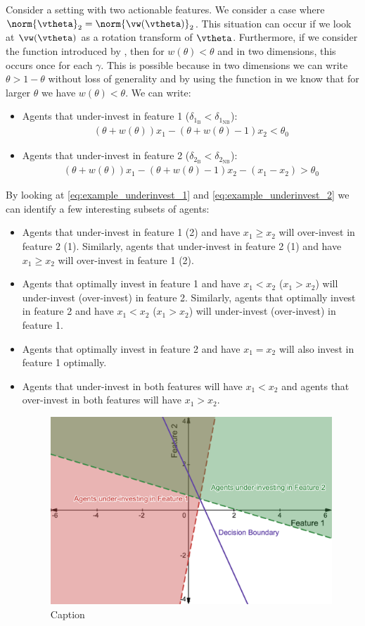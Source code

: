 Consider a setting with two actionable features. We consider a case where $\norm{\vtheta}_2 = \norm{\vw(\vtheta)}_2$. This situation can occur if we look at $\vw(\vtheta)$ as a rotation transform of $\vtheta$. Furthermore, if we consider the function introduced by \cite{Prelec1998}, then for $w(\theta)<\theta$ and in two dimensions, this occurs once for each $\gamma$. This is possible because in two dimensions we can write $\theta>1-\theta$ without loss of generality and by using the function in \cite{Prelec1998} we know that for larger $\theta$ we have $w(\theta)<\theta$. We can write:
\begin{itemize}
    \item Agents that under-invest in feature 1 ($\delta_{1_\text{B}}<\delta_{1_\text{NB}}$):
    \begin{align}\label{eq:example_underinvest_1}
         (\theta+w(\theta))x_1 - (\theta+w(\theta)-1)x_2 < \theta_0
    \end{align}
    \item Agents that under-invest in feature 2 ($\delta_{2_\text{B}}<\delta_{2_\text{NB}}$):
    \begin{align}\label{eq:example_underinvest_2}
         (\theta+w(\theta))x_1 - (\theta+w(\theta)-1)x_2 - (x_1-x_2) > \theta_0
    \end{align}
\end{itemize}
By looking at \eqref{eq:example_underinvest_1} and \eqref{eq:example_underinvest_2} we can identify a few interesting subsets of agents:
\begin{itemize}
    \item Agents that under-invest in feature 1 (2) and have $x_1\ge x_2$ will over-invest in feature 2 (1). Similarly, agents that under-invest in feature 2 (1) and have $x_1\ge x_2$ will over-invest in feature 1 (2).
    \item Agents that optimally invest in feature 1 and have $x_1<x_2$ ($x_1>x_2$) will under-invest (over-invest) in feature 2. Similarly, agents that optimally invest in feature 2 and have $x_1 < x_2$ ($x_1>x_2$) will under-invest (over-invest) in feature 1. 
    \item Agents that optimally invest in feature 2 and have $x_1=x_2$ will also invest in feature 1 optimally. 
    \item Agents that under-invest in both features will have $x_1<x_2$ and agents that over-invest in both features will have $x_1>x_2$.
\begin{figure}
    \centering
    \includegraphics[width=0.5\linewidth]{Figures/desmos-graph.png}
    \caption{Caption}
    \label{fig:unde-over-invest}
\end{figure}
\end{itemize}

